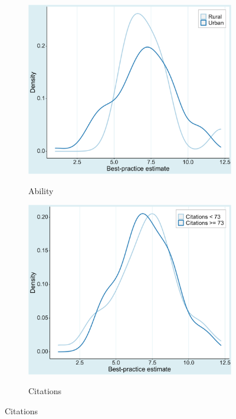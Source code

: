 \begin{figure}[!htbp]
\begin{center}
    \begin{subfigure}[!htbp]{0.38\textwidth}
      \vspace{0.2cm}
      \caption{Ability}
      \vspace{-0.1cm}
      \includegraphics[width=0.95\linewidth]{Figures/BPE/bpe_ability.png}
      \label{fig:bpe_ability}
    \end{subfigure}
    \begin{subfigure}[!htbp]{0.38\textwidth}
      \vspace{0.2cm}
      \caption{Citations}
      \vspace{-0.1cm}
      \includegraphics[width=0.95\linewidth]{Figures/BPE/bpe_citations.png}
      \label{fig:bpe_citations}
    \end{subfigure}


\end{center}
\end{figure}

